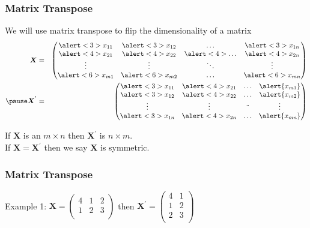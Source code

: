 \documentclass{beamer}
\numberwithin{equation}{section}
\begin{document}
\begin{frame}
\frametitle{Matrix Transpose} 

We will use matrix transpose to flip the dimensionality of a matrix \pause \\

\begin{eqnarray}
\boldsymbol{X} & = & \begin{pmatrix} 
 \alert<3>{x_{11}} & \alert<3>{x_{12}} & \hdots & \alert<3>{x_{1n}} \\
\alert<4>{x_{21}} & \alert<4>{x_{22}} & \alert<4>{\hdots} & \alert<4>{x_{2n}} \\
\vdots & \vdots & \ddots & \vdots \\
\alert<6>{x_{m1}} & \alert<6>{x_{m2}} & \hdots & \alert<6>{x_{mn} } \\
\end{pmatrix}  \nonumber  \\
\pause
\boldsymbol{X}^{'} &  = &  \begin{pmatrix} 
\alert<3>{x_{11}} &  \alert<4>{x_{21} } & \hdots& \alert{x_{m1} } \\
\alert<3>{x_{12}} & \alert<4>{x_{22} } & \hdots &\alert{x_{m2} } \\
\vdots & \vdots & \ddot & \vdots\\
\alert<3>{x_{1n} } & \alert<4>{x_{2n}} &\hdots & \alert{x_{mn} }\\
\end{pmatrix} 
\nonumber 
\end{eqnarray}


If $\boldsymbol{X}$ is an $m \times n$ then $\boldsymbol{X}^{'} $ is $n \times m$.  \\
If $\boldsymbol{X} = \boldsymbol{X}^{'}$ then we say $\boldsymbol{X}$ is symmetric. 

\end{frame}



\begin{frame}
\frametitle{Matrix Transpose}

Example 1:  $\boldsymbol{X} = \begin{pmatrix} 4 & 1 & 2 \\1 & 2  & 3 \\ \end{pmatrix} $ then 
$\boldsymbol{X}^{'} = \begin{pmatrix} 4 & 1 \\ 1 & 2 \\ 2 & 3 \\ \end{pmatrix} $ \\
\end{frame}
\end{document}
